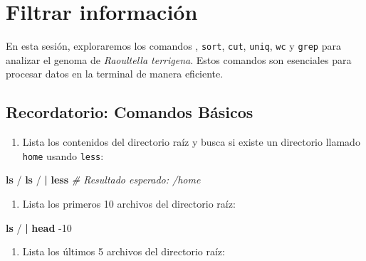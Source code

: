 \documentclass[
]{book}
\newenvironment{Shaded}{\begin{snugshade}}{\end{snugshade}}
\newcommand{\AttributeTok}[1]{\textcolor[rgb]{0.13,0.29,0.53}{#1}}
\newcommand{\CommentTok}[1]{\textcolor[rgb]{0.56,0.35,0.01}{\textit{#1}}}
\newcommand{\FunctionTok}[1]{\textcolor[rgb]{0.13,0.29,0.53}{\textbf{#1}}}
\newcommand{\KeywordTok}[1]{\textcolor[rgb]{0.13,0.29,0.53}{\textbf{#1}}}
\newcommand{\NormalTok}[1]{#1}
\providecommand{\tightlist}{%
  \setlength{\itemsep}{0pt}\setlength{\parskip}{0pt}}
\begin{document}
\chapter{Filtrar información}\label{filtrar-informaciuxf3n}

En esta sesión, exploraremos los comandos \texttt{\textbar{}}, \texttt{sort}, \texttt{cut}, \texttt{uniq}, \texttt{wc} y \texttt{grep} para analizar el genoma de \emph{Raoultella terrigena}. Estos comandos son esenciales para procesar datos en la terminal de manera eficiente.

\section{Recordatorio: Comandos Básicos}\label{recordatorio-comandos-buxe1sicos}

\begin{enumerate}
\def\labelenumi{\arabic{enumi}.}
\tightlist
\item
  Lista los contenidos del directorio raíz y busca si existe un directorio llamado \texttt{home} usando \texttt{less}:
\end{enumerate}

\begin{Shaded}
\begin{Highlighting}[]
\FunctionTok{ls}\NormalTok{ /}
\FunctionTok{ls}\NormalTok{ / }\KeywordTok{|} \FunctionTok{less}
\CommentTok{\# Resultado esperado: /home}
\end{Highlighting}
\end{Shaded}

\begin{enumerate}
\def\labelenumi{\arabic{enumi}.}
\setcounter{enumi}{1}
\tightlist
\item
  Lista los primeros 10 archivos del directorio raíz:
\end{enumerate}

\begin{Shaded}
\begin{Highlighting}[]
\FunctionTok{ls}\NormalTok{ / }\KeywordTok{|} \FunctionTok{head} \AttributeTok{{-}10}
\end{Highlighting}
\end{Shaded}

\begin{enumerate}
\def\labelenumi{\arabic{enumi}.}
\setcounter{enumi}{2}
\tightlist
\item
  Lista los últimos 5 archivos del directorio raíz:
\end{enumerate}
\end{document}
